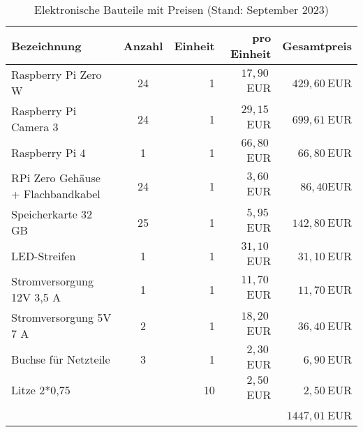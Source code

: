 \documentclass[./00_PhotoBox.tex]{subfiles}
\begin{document}
\begin{table}[h]
    \centering
    \begin{tabular}{l|c|r|r|r}
        Bezeichnung                       & Anzahl & Einheit & pro Einheit & Gesamtpreis   \\
        \hline
        Raspberry Pi Zero W               & 24     & 1       & $17,90~$EUR & $429,60~$EUR  \\
        Raspberry Pi Camera 3             & 24     & 1       & $29,15~$EUR & $699,61~$EUR  \\
        Raspberry Pi 4                    & 1      & 1       & $66,80~$EUR & $66,80~$EUR   \\
        RPi Zero Gehäuse + Flachbandkabel & 24     & 1       & $3,60~$EUR  & $86,40$EUR    \\
        Speicherkarte 32 GB               & 25     & 1       & $5,95~$EUR  & $142,80~$EUR  \\
        LED-Streifen                      & 1      & 1       & $31,10~$EUR & $31,10~$EUR   \\
        Stromversorgung 12V 3,5 A         & 1      & 1       & $11,70~$EUR & $11,70~$EUR   \\
        Stromversorgung 5V 7 A            & 2      & 1       & $18,20~$EUR & $36,40~$EUR   \\
        Buchse für Netzteile              & 3      & 1       & $2,30~$EUR  & $6,90~$EUR    \\
        Litze 2*0,75                      &        & 10      & $2,50~$EUR  & $2,50~$EUR    \\
                                          &        &         &             & $1447,01~$EUR \\
    \end{tabular}
    \caption{Elektronische Bauteile mit Preisen (Stand: September 2023)}
    \label{tab:bauteile_elektronisch}
\end{table}
\end{document}
